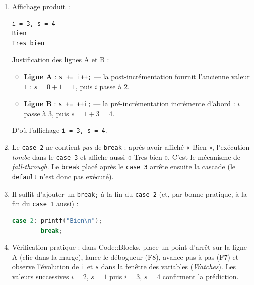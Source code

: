 \documentclass[11pt]{article}
\begin{document}
\begin{corrige}
\begin{enumerate}
\item Affichage produit :
\begin{lstlisting}
i = 3, s = 4
Bien
Tres bien
\end{lstlisting}
Justification des lignes A et B :
\begin{itemize}
\item \textbf{Ligne A} : \texttt{s += i++;} — la post-incrémentation fournit l'ancienne valeur $1$ : $s = 0 + 1 = 1$, puis $i$ passe à $2$.
\item \textbf{Ligne B} : \texttt{s += ++i;} — la pré-incrémentation incrémente d'abord : $i$ passe à $3$, puis $s = 1 + 3 = 4$.
\end{itemize}
D'où l'affichage \texttt{i = 3, s = 4}.
\item Le \texttt{case 2} ne contient \emph{pas} de \texttt{break} : après avoir affiché « Bien », l'exécution \emph{tombe} dans le \texttt{case 3} et affiche aussi « Tres bien ». C'est le mécanisme de \emph{fall-through}. Le \texttt{break} placé après le \texttt{case 3} arrête ensuite la cascade (le \texttt{default} n'est donc pas exécuté).
\item Il suffit d'ajouter un \texttt{break;} à la fin du \texttt{case 2} (et, par bonne pratique, à la fin du \texttt{case 1} aussi) :
\begin{lstlisting}[language=C]
case 2: printf("Bien\n");
        break;
\end{lstlisting}
\item Vérification pratique : dans Code::Blocks, place un point d'arrêt sur la ligne A (clic dans la marge), lance le débogueur (F8), avance pas à pas (F7) et observe l'évolution de \texttt{i} et \texttt{s} dans la fenêtre des variables (\emph{Watches}). Les valeurs successives $i = 2$, $s = 1$ puis $i = 3$, $s = 4$ confirment la prédiction.
\end{enumerate}
\end{corrige}
\end{document}
